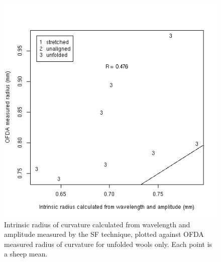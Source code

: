 %

\begin{figure}[!h]
  \centering
  \includegraphics[width=1.0\textwidth]{figwaradthetaunfoldsf.png}
  \caption{Intrinsic radius of curvature calculated from wavelength and amplitude measured by the SF technique, plotted against OFDA measured radius of curvature for unfolded wools only. Each point is a sheep mean.}
  \label{fig:waradthetaunfoldsf}
\end{figure}

%

